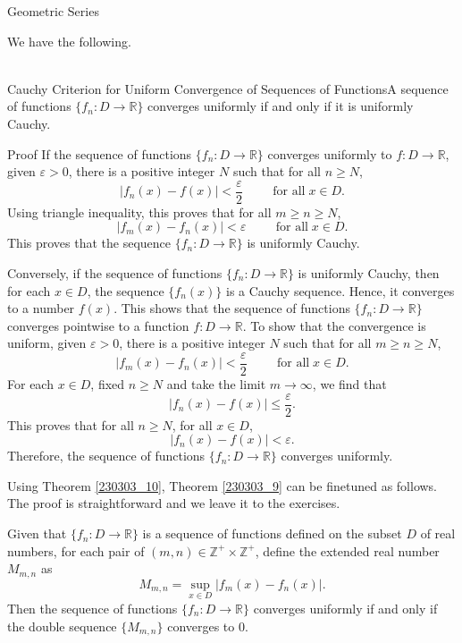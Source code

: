 \begin{example}[label=230305_16]{Geometric Series}
\begin{definition}
\end{definition}
We have the following.
\begin{theorem}[label=230303_10]{~\\Cauchy Criterion for Uniform Convergence of Sequences of Functions}A sequence of functions $\{f_n:D\to\mathbb{R}\}$ converges uniformly if and only if it is uniformly Cauchy.
\end{theorem}
\begin{myproof}{Proof}
If the sequence of functions $\{f_n:D\to\mathbb{R}\}$ converges uniformly to $f:D\to\mathbb{R}$, given $\varepsilon>0$, there is a positive integer $N$ such that for all $n\geq N$,
\[|f_n(x)-f(x)|<\frac{\varepsilon}{2}\hspace{1cm}\text{for all}\;x\in D.\]
\bp
Using triangle inequality, this proves that for all $m\geq n\geq N$,
\[|f_m(x)-f_n(x)|<\varepsilon\hspace{1cm}\text{for all}\;x\in D.\]This proves that the sequence   $\{f_n:D\to\mathbb{R}\}$ is  uniformly Cauchy.


Conversely, if the sequence of functions $\{f_n:D\to\mathbb{R}\}$ is  uniformly Cauchy, then for each $x\in D$, the sequence $\{f_n(x)\}$ is a Cauchy sequence. Hence, it converges to a number $f(x)$. This shows that the sequence of functions $\{f_n:D\to\mathbb{R}\}$ converges pointwise to a function $f:D\to\mathbb{R}$. To show that the convergence is uniform, given $\varepsilon>0$, there is a positive integer $N$ such that for all $m\geq n\geq N$, 
\[|f_m(x)-f_n(x)|<\frac{\varepsilon}{2}\hspace{1cm}\text{for all}\;x\in D.\]   For each $x\in D$,  fixed $n\geq N$ and take the limit $m\to\infty$, we find that
\[|f_n(x)-f(x)|\leq\frac{\varepsilon}{2}.\]
This proves that for all $n\geq N$, for all $x\in D$, \[|f_n(x)-f(x)|<\varepsilon.\]Therefore, the sequence of functions $\{f_n:D\to\mathbb{R}\}$ converges uniformly.
\end{myproof}

Using Theorem \ref{230303_10},
Theorem \ref{230303_9} can be finetuned as follows. The proof is straightforward and we leave it to the exercises.
\begin{theorem}[label=230303_11]{}
Given that $\{f_n:D\to\mathbb{R}\}$ is a sequence of functions defined on the subset $D$ of real numbers, for each pair of $(m,n)\in\mathbb{Z}^+\times\mathbb{Z}^+$, define the extended real number $M_{m,n}$ as
\[M_{m,n}=\sup_{x\in D}|f_m(x)-f_n(x)|.\]Then the sequence of functions  $\{f_n:D\to\mathbb{R}\}$ converges uniformly if and only if the double sequence $\{M_{m,n}\}$ converges to 0.
\end{theorem}



\end{example}
